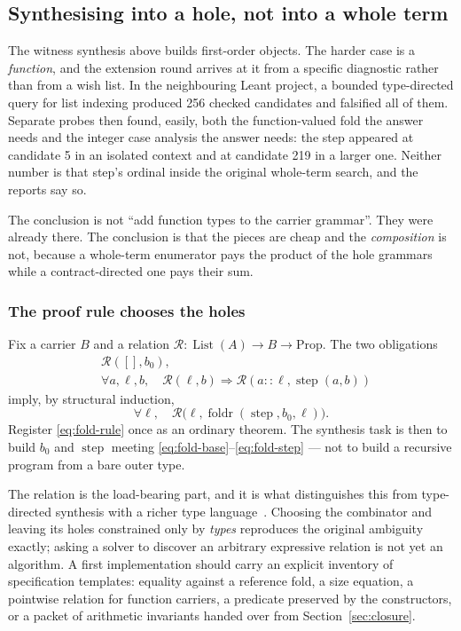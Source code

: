 \subsection{Synthesising into a hole, not into a whole term}
\label{sec:holes}

The witness synthesis above builds first-order objects. The harder case is a
\emph{function}, and the extension round arrives at it from a specific
diagnostic rather than from a wish list. In the neighbouring Leant project, a
bounded type-directed query for list indexing produced 256 checked candidates
and falsified all of them. Separate probes then found, easily, both the
function-valued fold the answer needs and the integer case analysis the answer
needs: the step appeared at candidate 5 in an isolated context and at candidate
219 in a larger one. Neither number is that step's ordinal inside the original
whole-term search, and the reports say so.

The conclusion is not ``add function types to the carrier grammar''. They were
already there. The conclusion is that the pieces are cheap and the
\emph{composition} is not, because a whole-term enumerator pays the product of
the hole grammars while a contract-directed one pays their sum.

\subsubsection*{The proof rule chooses the holes}

Fix a carrier $B$ and a relation
$\mathcal R:\operatorname{List}(A)\to B\to\mathrm{Prop}$. The two obligations
\begin{align}
 &\mathcal R([],b_0),\label{eq:fold-base}\\
 &\forall a,\ell,b,\quad \mathcal R(\ell,b)\Longrightarrow
   \mathcal R(a::\ell,\operatorname{step}(a,b))\label{eq:fold-step}
\end{align}
imply, by structural induction,
\begin{equation}\label{eq:fold-rule}
 \forall\ell,\quad
 \mathcal R\bigl(\ell,\operatorname{foldr}(\operatorname{step},b_0,\ell)\bigr).
\end{equation}
Register \eqref{eq:fold-rule} once as an ordinary theorem. The synthesis task is
then to build $b_0$ and $\operatorname{step}$ meeting
\eqref{eq:fold-base}--\eqref{eq:fold-step} --- not to build a recursive program
from a bare outer type.

The relation is the load-bearing part, and it is what distinguishes this from
type-directed synthesis with a richer type language~\cite{synquid,tygar}.
Choosing the combinator and leaving its holes constrained only by \emph{types}
reproduces the original ambiguity exactly; asking a solver to discover an arbitrary expressive relation is not yet
an algorithm. A first implementation should carry an explicit inventory of
specification templates: equality against a reference fold, a size equation, a
pointwise relation for function carriers, a predicate preserved by the
constructors, or a packet of arithmetic invariants handed over from
Section~\ref{sec:closure}.

